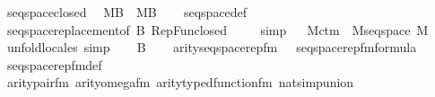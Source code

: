 \begin{isabellebody}
\isanewline
\isanewline
{}\isamarkupfalse%
\ seqspace{\isacharunderscore}{\kern0pt}closed{\isacharcolon}{\kern0pt}\isanewline
\ \ {\isachardoublequoteopen}M{\isacharparenleft}{\kern0pt}B{\isacharparenright}{\kern0pt}\ {\isasymLongrightarrow}\ M{\isacharparenleft}{\kern0pt}B{\isacharcircum}{\kern0pt}{\isacharless}{\kern0pt}{\isasymomega}{\isacharparenright}{\kern0pt}{\isachardoublequoteclose}\isanewline
%
\isadelimproof
\ \ %
\endisadelimproof
%
\isatagproof
{}\isamarkupfalse%
\ seqspace{\isacharunderscore}{\kern0pt}def\ \isamarkupfalse%
\ seqspace{\isacharunderscore}{\kern0pt}replacement{\isacharbrackleft}{\kern0pt}of\ B{\isacharbrackright}{\kern0pt}\ RepFun{\isacharunderscore}{\kern0pt}closed{}\ \isanewline
\ \ \isamarkupfalse%
\ simp%
\endisatagproof
{\isafoldproof}%
%
\isadelimproof
\isanewline
%
\endisadelimproof
\isanewline
{}\isamarkupfalse%
\ \isanewline
\isanewline
\isanewline
{}\isamarkupfalse%
\ M{\isacharunderscore}{\kern0pt}ctm\ {\isasymsubseteq}\ M{\isacharunderscore}{\kern0pt}seqspace\ {\isachardoublequoteopen}{\isacharhash}{\kern0pt}{\isacharhash}{\kern0pt}M{\isachardoublequoteclose}\isanewline
%
\isadelimproof
%
\endisadelimproof
%
\isatagproof
{}\isamarkupfalse%
\ {\isacharparenleft}{\kern0pt}unfold{\isacharunderscore}{\kern0pt}locales{\isacharcomma}{\kern0pt}\ simp{\isacharparenright}{\kern0pt}\isanewline
\ \ \isamarkupfalse%
\ B\isanewline
\ \ \isamarkupfalse%
\ {\isachardoublequoteopen}arity{\isacharparenleft}{\kern0pt}seqspace{\isacharunderscore}{\kern0pt}rep{\isacharunderscore}{\kern0pt}fm{\isacharparenleft}{\kern0pt}{}{\isacharcomma}{\kern0pt}{}{\isacharcomma}{\kern0pt}{}{\isacharparenright}{\kern0pt}{\isacharparenright}{\kern0pt}\ {\isasymle}\ {}{\isachardoublequoteclose}\ {\isachardoublequoteopen}seqspace{\isacharunderscore}{\kern0pt}rep{\isacharunderscore}{\kern0pt}fm{\isacharparenleft}{\kern0pt}{}{\isacharcomma}{\kern0pt}{}{\isacharcomma}{\kern0pt}{}{\isacharparenright}{\kern0pt}{\isasymin}formula{\isachardoublequoteclose}\ \isanewline
\ \ \ \ \isamarkupfalse%
\ seqspace{\isacharunderscore}{\kern0pt}rep{\isacharunderscore}{\kern0pt}fm{\isacharunderscore}{\kern0pt}def\ \isanewline
\ \ \ \ \isamarkupfalse%
\ arity{\isacharunderscore}{\kern0pt}pair{\isacharunderscore}{\kern0pt}fm\ arity{\isacharunderscore}{\kern0pt}omega{\isacharunderscore}{\kern0pt}fm\ arity{\isacharunderscore}{\kern0pt}typed{\isacharunderscore}{\kern0pt}function{\isacharunderscore}{\kern0pt}fm\ nat{\isacharunderscore}{\kern0pt}simp{\isacharunderscore}{\kern0pt}union\ \isanewline

\end{isabellebody}
